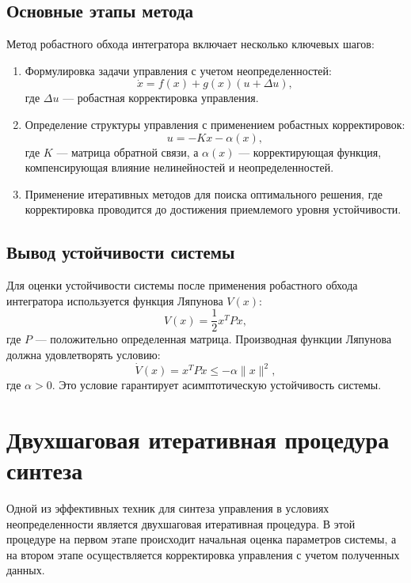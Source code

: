 \documentclass[a4paper,14pt]{extarticle} %
\begin{document}
\subsection{Основные этапы метода}
Метод робастного обхода интегратора включает несколько ключевых шагов:
\begin{enumerate}
    \item Формулировка задачи управления с учетом неопределенностей:
    \begin{equation}
        \dot{x} = f(x) + g(x)(u + \Delta u),
    \end{equation}
    где \(\Delta u\) — робастная корректировка управления.
    \item Определение структуры управления с применением робастных корректировок:
    \begin{equation}
        u = -Kx - \alpha(x),
    \end{equation}
    где \(K\) — матрица обратной связи, а \(\alpha(x)\) — корректирующая функция, компенсирующая влияние нелинейностей и неопределенностей.
    \item Применение итеративных методов для поиска оптимального решения, где корректировка проводится до достижения приемлемого уровня устойчивости.
\end{enumerate}

\subsection{Вывод устойчивости системы}
Для оценки устойчивости системы после применения робастного обхода интегратора используется функция Ляпунова \(V(x)\):
\begin{equation}
    V(x) = \frac{1}{2}x^T P x,
\end{equation}
где \(P\) — положительно определенная матрица. Производная функции Ляпунова должна удовлетворять условию:
\begin{equation}
    \dot{V}(x) = x^T P \dot{x} \leq -\alpha \|x\|^2,
\end{equation}
где \(\alpha > 0\). Это условие гарантирует асимптотическую устойчивость системы.

\newpage
\section{Двухшаговая итеративная процедура синтеза}
Одной из эффективных техник для синтеза управления в условиях неопределенности является двухшаговая итеративная процедура. В этой процедуре на первом этапе происходит начальная оценка параметров системы, а на втором этапе осуществляется корректировка управления с учетом полученных данных.
\end{document}
